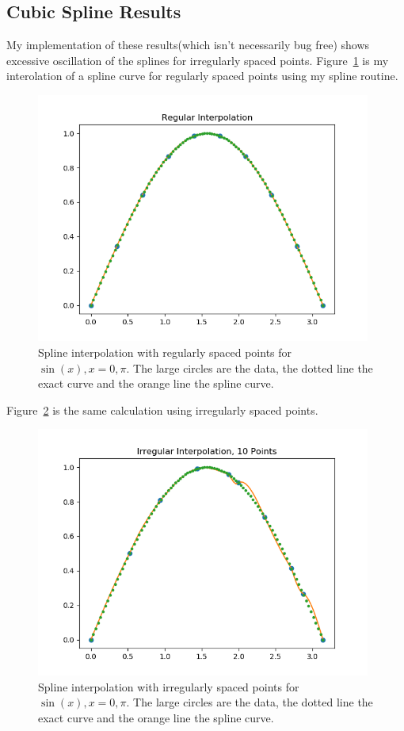 \documentclass{scrartcl}
\begin{document}
\subsection{Cubic Spline Results}
My implementation of these results(which isn't necessarily bug free)
shows excessive oscillation of the splines for irregularly spaced
points. Figure~\ref{fig:regSpline} is my interolation of a spline
curve for regularly spaced points using my spline routine.
\begin{figure}
\begin{center}
\includegraphics[width=11cm]{regSpline}
\end{center}
\caption{\label{fig:regSpline}Spline interpolation with regularly spaced
points for $\sin(x), x=0,\pi$. The large circles are the data, the dotted
line the exact curve and the orange line the spline curve.}
\end{figure}
Figure~\ref{fig:irregSpline} is the same calculation using irregularly
spaced points.
\begin{figure}
\begin{center}
\includegraphics[width=11cm]{irregSpline}
\end{center}
\caption{\label{fig:irregSpline}Spline interpolation with irregularly
spaced points for $\sin(x), x=0,\pi$. The large circles are the data,
the dotted line the exact curve and the orange line the spline curve.}
\end{figure}
\end{document}

